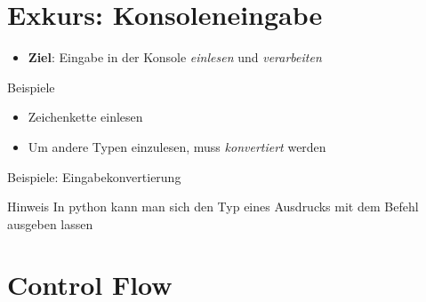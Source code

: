 \section{Exkurs: Konsoleneingabe}
\begin{frame}
    \slidehead

    \begin{itemize}
        \item \textbf{Ziel}: Eingabe in der Konsole \textit{einlesen} und \textit{verarbeiten}
    \end{itemize}

    \begin{block}{Beispiele}
        \begin{itemize}
            \item Zeichenkette einlesen
            \item Um andere Typen einzulesen, muss \textit{konvertiert} werden
        \end{itemize}
    \end{block}
\end{frame}

\begin{frame}
    \slidehead

    Beispiele: Eingabekonvertierung

    \begin{block}{Hinweis}
        In python kann man sich den Typ eines Ausdrucks mit dem Befehl  ausgeben lassen
    \end{block}
\end{frame}

\livecoding

\section{Control Flow}

